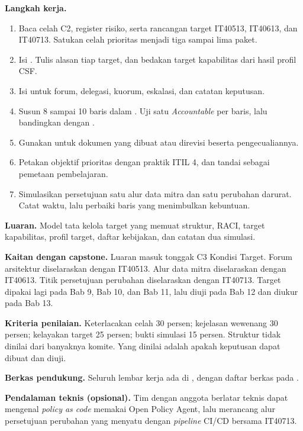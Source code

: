 \textbf{Langkah kerja.}
\begin{enumerate}
  \item Baca celah C2, register risiko, serta rancangan target IT40513, IT40613, dan IT40713.
  Satukan celah prioritas menjadi tiga sampai lima paket.
  \item Isi . Tulis alasan tiap target, dan
  bedakan target kapabilitas dari hasil profil CSF.
  \item Isi  untuk forum, delegasi, kuorum,
  eskalasi, dan catatan keputusan.
  \item Susun 8 sampai 10 baris dalam . Uji satu
  \textit{Accountable} per baris, lalu bandingkan dengan
  .
  \item Gunakan  untuk dokumen yang dibuat atau
  direvisi beserta pengecualiannya.
  \item Petakan objektif prioritas dengan praktik ITIL 4, dan tandai sebagai pemetaan pembelajaran.
  \item Simulasikan persetujuan satu alur data mitra dan satu perubahan darurat. Catat waktu, lalu
  perbaiki baris yang menimbulkan kebuntuan.
\end{enumerate}

\textbf{Luaran.} Model tata kelola target yang memuat struktur, RACI, target kapabilitas, profil
target, daftar kebijakan, dan catatan dua simulasi.

\textbf{Kaitan dengan capstone.} Luaran masuk tonggak C3 Kondisi Target. Forum arsitektur
diselaraskan dengan IT40513. Alur data mitra diselaraskan dengan IT40613. Titik persetujuan
perubahan diselaraskan dengan IT40713. Target dipakai lagi pada Bab 9, Bab 10, dan Bab 11, lalu
diuji pada Bab 12 dan diukur pada Bab 13.

\textbf{Kriteria penilaian.} Keterlacakan celah 30 persen; kejelasan wewenang 30 persen; kelayakan
target 25 persen; bukti simulasi 15 persen. Struktur tidak dinilai dari banyaknya komite. Yang
dinilai adalah apakah keputusan dapat dibuat dan diuji.

\textbf{Berkas pendukung.} Seluruh lembar kerja ada di , dengan daftar
berkas pada .

\textbf{Pendalaman teknis (opsional).} Tim dengan anggota berlatar teknis dapat mengenal
\textit{policy as code} memakai Open Policy Agent, lalu merancang alur persetujuan perubahan yang
menyatu dengan \textit{pipeline} CI/CD bersama IT40713.

